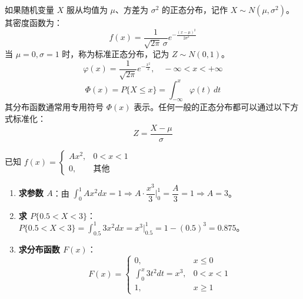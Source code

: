 \begin{definition}[正态分布]
如果随机变量 $X$ 服从均值为 $\mu$、方差为 $\sigma^2$ 的正态分布，记作 $X \sim N(\mu, \sigma^2)$。其密度函数为：
\begin{equation}
	f(x) = \frac{1}{\sqrt{2\pi}\,\sigma} e^{-\frac{(x-\mu)^2}{2\sigma^2}}
	\label{eq:第二章:正态密度}
\end{equation}
当 $\mu = 0, \sigma = 1$ 时，称为标准正态分布，记为 $Z \sim N(0, 1)$。
\begin{equation}
	\varphi(x) = \frac{1}{\sqrt{2\pi}} e^{-\frac{x^{2}}{2}}, \quad -\infty < x < +\infty
	\label{eq:第二章:标准正态密度}
\end{equation}
\begin{equation}
	\Phi(x) = P\{X \le x\} = \int_{-\infty}^{x} \varphi(t)\,dt
	\label{eq:第二章:标准正态分布函数}
\end{equation}
其分布函数通常用专用符号 $\Phi(x)$ 表示。任何一般的正态分布都可以通过以下方式标准化：
\begin{equation}
	Z = \frac{X - \mu}{\sigma}
	\label{eq:第二章:标准化}
\end{equation}
\end{definition}

\begin{example}
已知 $f(x) = \begin{cases} A x^{2}, & 0 < x < 1 \\ 0, & \text{其他} \end{cases}$
\begin{enumerate}
	\item \textbf{求参数 $A$}：由 $\int_{0}^{1} A x^{2} dx = 1 \Rightarrow A \cdot \dfrac{x^{3}}{3}\Big|_{0}^{1} = \dfrac{A}{3} = 1 \Rightarrow A = 3$。
	\item \textbf{求 $P\{0.5 < X < 3\}$}：$P\{0.5 < X < 3\} = \int_{0.5}^{1} 3 x^{2} dx = x^{3}\Big|_{0.5}^{1} = 1 - (0.5)^{3} = 0.875$。
	\item \textbf{求分布函数 $F(x)$}：
	\begin{equation}
		F(x) = \begin{cases} 0, & x \le 0 \\[1ex] \displaystyle\int_{0}^{x} 3 t^{2} dt = x^{3}, & 0 < x < 1 \\[1ex] 1, & x \ge 1 \end{cases}
		\label{eq:第二章:例1分布函数}
	\end{equation}
\end{enumerate}
\end{example}

